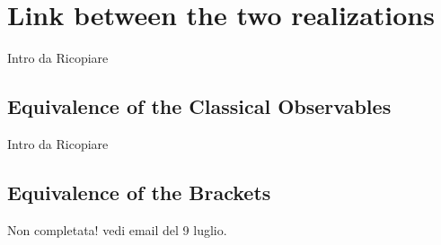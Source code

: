\documentclass[Main]{subfiles}
\begin{document}
		
\section{Link between the two realizations}	
		\begin{Warning}
			Intro da Ricopiare
		\end{Warning}
	
	\subsection{Equivalence of the Classical Observables}	
		\begin{Warning}
			Intro da Ricopiare
		\end{Warning}
	\subsection{Equivalence of the Brackets}	
		\begin{Warning}
			Non completata! vedi email del 9 luglio.
		\end{Warning}
\end{document}
